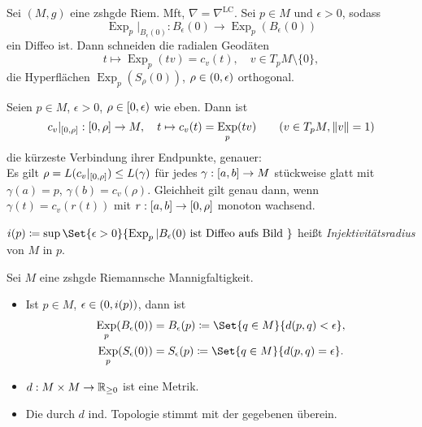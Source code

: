 \documentclass{cheat-sheet}
\DeclareMathOperator{\Exp}{Exp} %
\newcommand{\abinterval}{\cinterval{a}{b}} %
\newcommand{\LC}{\nabla^{\mathrm{LC}}} %
\begin{document}
\begin{satz} %
  Sei $(M, g)$ eine zshgde Riem. Mft, $\nabla = \LC$. Sei $p \in M$ und $\epsilon > 0$, sodass
  \[ \Exp_p|_{B_{\epsilon}(0)} : B_{\epsilon}(0) \to \Exp_p(B_{\epsilon}(0)) \]
  ein Diffeo ist. Dann schneiden die radialen Geodäten
  \[ t \mapsto \Exp_p(tv) = c_v(t), \quad v \in T_p M \setminus \{ 0 \},  \]
  die Hyperflächen $\Exp_p(S_\rho(0))$, $\rho \in \left( 0, \epsilon \right)$ orthogonal.
\end{satz}

\begin{satz}
  Seien $p \in M$, $\epsilon > 0$, $\rho \in \left[ 0, \epsilon \right)$ wie eben. Dann ist
  \[
    c_v|_{\cinterval{0}{\rho}} : \cinterval{0}{\rho} \to M, \quad
    t \mapsto c_v(t) = \Exp_p(t v) \qquad
    (v \in T_p M, \norm{v} = 1)
  \]
  die kürzeste Verbindung ihrer Endpunkte, genauer: \\
  Es gilt $\rho = L(c_v|_{\left[ 0, \rho \right]}) \leq L(\gamma)$ für jedes $\gamma : \abinterval \to M$ stückweise glatt mit $\gamma(a) = p$, $\gamma(b) = c_v(\rho)$.
  Gleichheit gilt genau dann, wenn $\gamma(t) = c_v(r(t))$ mit $r : \abinterval \to \cinterval{0}{\rho}$ monoton wachsend.
\end{satz}


\begin{defn}
  $i(p) \coloneqq \sup \Set{ \epsilon > 0 }{ \Exp_p|B_{\epsilon}(0) \text{ ist Diffeo aufs Bild } }$
  heißt \emph{Injektivitätsradius} von $M$ in $p$.
\end{defn}

\begin{satz}
  Sei $M$ eine zshgde Riemannsche Mannigfaltigkeit.
  \begin{itemize}
    \item Ist $p \in M$, $\epsilon \in \left( 0, i(p) \right)$, dann ist
    \begin{align*}
      \Exp_p(B_\epsilon(0)) & = B_\epsilon(p) \coloneqq \Set{q \in M}{d(p, q) < \epsilon},\\
      \Exp_p(S_\epsilon(0)) & = S_\epsilon(p) \coloneqq \Set{q \in M}{d(p, q) = \epsilon}.
    \end{align*}
    \item $d : M \times M \to \mathbb{R}_{\geq 0}$ ist eine Metrik.
    \item Die durch $d$ ind. Topologie stimmt mit der gegebenen überein.
  \end{itemize}
\end{satz}
\end{document}
